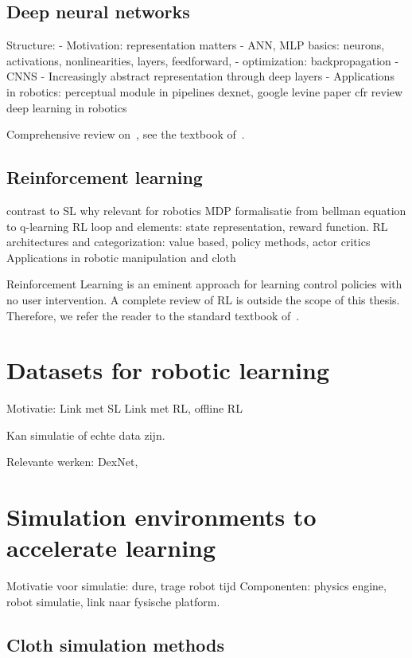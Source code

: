 \documentclass[\home/main.tex]{subfiles}
\begin{document}
\subsection{Deep neural networks} \label{subsec:lit_dnn}
Structure: 
	- Motivation: representation matters
	- ANN, MLP basics: neurons, activations, nonlinearities, layers, feedforward, 
	- optimization: backpropagation 
	- CNNS
	- Increasingly abstract representation through deep layers 
	- Applications in robotics:
		perceptual module in pipelines
		dexnet, google levine paper
		cfr review deep learning in robotics 

Comprehensive review on~, see the textbook of~\textcite{Goodfellow2016}.

\subsection{Reinforcement learning} \label{subsec:lit_rl}
contrast to SL 
why relevant for robotics
MDP formalisatie
from bellman equation to q-learning 
RL loop and elements: state representation, reward function. 
RL architectures and categorization: value based, policy methods, actor critics 
Applications in robotic manipulation and cloth 

Reinforcement Learning is an eminent approach for learning control policies with no user intervention. A complete review of RL is outside the scope of this thesis. Therefore, we refer the reader to the standard textbook of~\textcite{Sutton2018}.

\section{Datasets for robotic learning} \label{sec:lit_datasets}
Motivatie:
	Link met SL
	Link met RL, offline RL 

Kan simulatie of echte data zijn. 

Relevante werken:
	DexNet, 

\section{Simulation environments to accelerate learning} \label{sec:lit_simulation}

Motivatie voor simulatie: dure, trage robot tijd 
Componenten: physics engine, robot simulatie, link naar fysische platform.

\subsection{Cloth simulation methods} \label{subsec:lit_cloth_sim}
\end{document}
